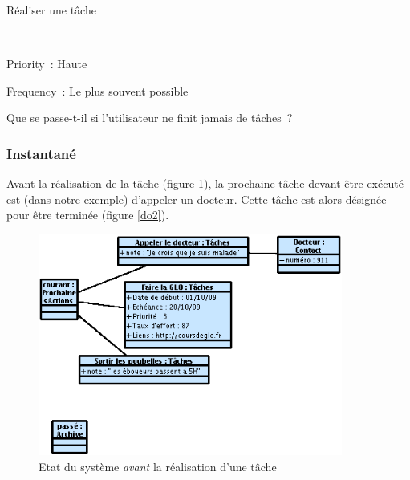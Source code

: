 \begin{usecase}{Réaliser une tâche}
\begin{variation}
\\
\end{variation}
\begin{relatedinformation}
\item[Priority~:] Haute
\item[Frequency~:] Le plus souvent possible
\\
\end{relatedinformation}
\begin{openissues}
\item Que se passe-t-il si l'utilisateur ne finit jamais de tâches~?
\\
\end{openissues}
\end{usecase}

\subsubsection{Instantané}

Avant la réalisation de la tâche (figure \ref{do1}), la prochaine tâche devant être exécuté est (dans notre exemple) d'appeler un docteur. Cette tâche est alors désignée pour être terminée (figure \ref{do2}).

\begin{figure}[!ht]
\begin{center}
\includegraphics[width=10cm]{images/Instantane_Do_1.png}
\caption{Etat du système \emph{avant} la réalisation d'une tâche}
\label{do1}
\end{center}
\end{figure}


